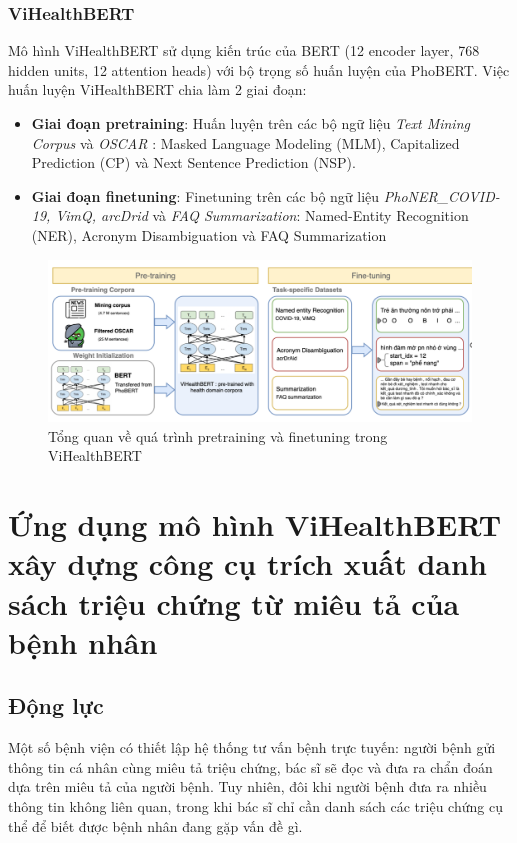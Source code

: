 \documentclass[12pt]{article}
\begin{document}
\subsubsection{ViHealthBERT}
Mô hình ViHealthBERT sử dụng kiến trúc của BERT (12 encoder layer, 768 hidden units, 12 attention heads) với bộ trọng số huấn luyện của PhoBERT. Việc huấn luyện ViHealthBERT chia làm 2 giai đoạn:
\begin{itemize}
\item \textbf{Giai đoạn pretraining}: Huấn luyện trên các bộ ngữ liệu \textit{Text Mining Corpus} và \textit{OSCAR} : Masked Language Modeling (MLM), Capitalized Prediction (CP) và Next Sentence Prediction (NSP).
\item \textbf{Giai đoạn finetuning}: Finetuning trên các bộ ngữ liệu \textit{PhoNER\_COVID-19, VimQ, arcDrid} và \textit{FAQ Summarization}: Named-Entity Recognition (NER), Acronym Disambiguation và FAQ Summarization
\end{itemize}
\begin{figure}
\begin{center}
\includegraphics[scale=.8]{img/ViHealthBERT.png}
\caption{Tổng quan về quá trình pretraining và finetuning trong ViHealthBERT\cite{minh-EtAl:2022:LREC}}
\end{center}
\end{figure}

\section{Ứng dụng mô hình ViHealthBERT xây dựng công cụ trích xuất danh sách triệu chứng từ miêu tả của bệnh nhân}
\subsection{Động lực}
Một số bệnh viện có thiết lập hệ thống tư vấn bệnh trực tuyến: người bệnh gửi thông tin cá nhân cùng miêu tả triệu chứng, bác sĩ sẽ đọc và đưa ra chẩn đoán dựa trên miêu tả của người bệnh. Tuy nhiên, đôi khi người bệnh đưa ra nhiều thông tin không liên quan, trong khi bác sĩ chỉ cần danh sách các triệu chứng cụ thể để biết được bệnh nhân đang gặp vấn đề gì.
\end{document}
